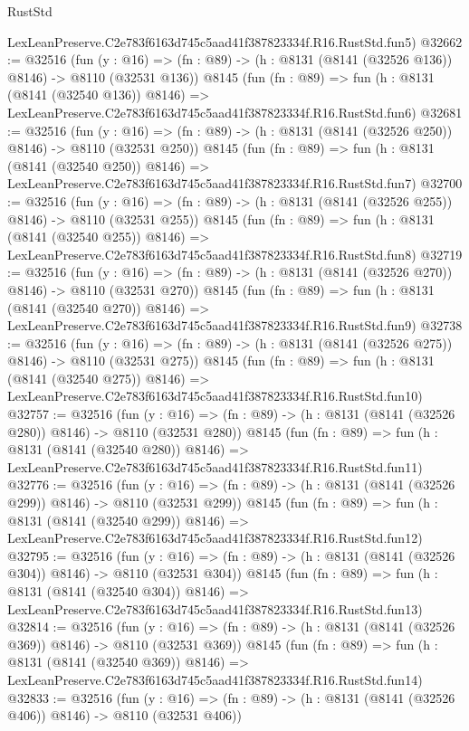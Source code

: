 \begin{lexlean}{RustStd}
\begin{coremodule}
    LexLeanPreserve.C2e783f6163d745c5aad41f387823334f.R16.RustStd.fun5)
@32662 := @32516
    (fun (y : @16) => (fn : @89) -> (h : @8131 (@8141 (@32526 @136)) @8146) -> @8110 (@32531 @136))
    @8145
    (fun (fn : @89) =>
    fun (h : @8131 (@8141 (@32540 @136)) @8146) =>
    LexLeanPreserve.C2e783f6163d745c5aad41f387823334f.R16.RustStd.fun6)
@32681 := @32516
    (fun (y : @16) => (fn : @89) -> (h : @8131 (@8141 (@32526 @250)) @8146) -> @8110 (@32531 @250))
    @8145
    (fun (fn : @89) =>
    fun (h : @8131 (@8141 (@32540 @250)) @8146) =>
    LexLeanPreserve.C2e783f6163d745c5aad41f387823334f.R16.RustStd.fun7)
@32700 := @32516
    (fun (y : @16) => (fn : @89) -> (h : @8131 (@8141 (@32526 @255)) @8146) -> @8110 (@32531 @255))
    @8145
    (fun (fn : @89) =>
    fun (h : @8131 (@8141 (@32540 @255)) @8146) =>
    LexLeanPreserve.C2e783f6163d745c5aad41f387823334f.R16.RustStd.fun8)
@32719 := @32516
    (fun (y : @16) => (fn : @89) -> (h : @8131 (@8141 (@32526 @270)) @8146) -> @8110 (@32531 @270))
    @8145
    (fun (fn : @89) =>
    fun (h : @8131 (@8141 (@32540 @270)) @8146) =>
    LexLeanPreserve.C2e783f6163d745c5aad41f387823334f.R16.RustStd.fun9)
@32738 := @32516
    (fun (y : @16) => (fn : @89) -> (h : @8131 (@8141 (@32526 @275)) @8146) -> @8110 (@32531 @275))
    @8145
    (fun (fn : @89) =>
    fun (h : @8131 (@8141 (@32540 @275)) @8146) =>
    LexLeanPreserve.C2e783f6163d745c5aad41f387823334f.R16.RustStd.fun10)
@32757 := @32516
    (fun (y : @16) => (fn : @89) -> (h : @8131 (@8141 (@32526 @280)) @8146) -> @8110 (@32531 @280))
    @8145
    (fun (fn : @89) =>
    fun (h : @8131 (@8141 (@32540 @280)) @8146) =>
    LexLeanPreserve.C2e783f6163d745c5aad41f387823334f.R16.RustStd.fun11)
@32776 := @32516
    (fun (y : @16) => (fn : @89) -> (h : @8131 (@8141 (@32526 @299)) @8146) -> @8110 (@32531 @299))
    @8145
    (fun (fn : @89) =>
    fun (h : @8131 (@8141 (@32540 @299)) @8146) =>
    LexLeanPreserve.C2e783f6163d745c5aad41f387823334f.R16.RustStd.fun12)
@32795 := @32516
    (fun (y : @16) => (fn : @89) -> (h : @8131 (@8141 (@32526 @304)) @8146) -> @8110 (@32531 @304))
    @8145
    (fun (fn : @89) =>
    fun (h : @8131 (@8141 (@32540 @304)) @8146) =>
    LexLeanPreserve.C2e783f6163d745c5aad41f387823334f.R16.RustStd.fun13)
@32814 := @32516
    (fun (y : @16) => (fn : @89) -> (h : @8131 (@8141 (@32526 @369)) @8146) -> @8110 (@32531 @369))
    @8145
    (fun (fn : @89) =>
    fun (h : @8131 (@8141 (@32540 @369)) @8146) =>
    LexLeanPreserve.C2e783f6163d745c5aad41f387823334f.R16.RustStd.fun14)
@32833 := @32516
    (fun (y : @16) => (fn : @89) -> (h : @8131 (@8141 (@32526 @406)) @8146) -> @8110 (@32531 @406))

\end{coremodule}
\end{lexlean}

